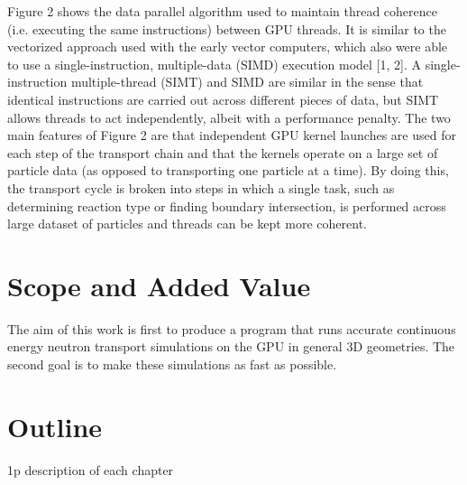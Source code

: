 Figure 2 shows the data parallel algorithm used to maintain thread coherence (i.e. executing the same instructions) between GPU threads.  It is similar to the vectorized approach used with the early vector computers, which also were able to use a single-instruction, multiple-data (SIMD) execution model [1, 2].  A single-instruction multiple-thread (SIMT) and SIMD are similar in the sense that identical instructions are carried out across different pieces of data, but SIMT allows threads to act independently, albeit with a performance penalty.   The two main features of Figure 2 are that independent GPU kernel launches are used for each step of the transport chain and that the kernels operate on a large set of particle data (as opposed to transporting one particle at a time).  By doing this, the transport cycle is broken into steps in which a single task, such as determining reaction type or finding boundary intersection, is performed across large dataset of particles and threads can be kept more coherent.

\section{Scope and Added Value}

The aim of this work is first to produce a program that runs accurate continuous energy neutron transport simulations on the GPU in general 3D geometries.  The second goal is to make these simulations as fast as possible.  


\section{Outline}

1p description of each chapter
